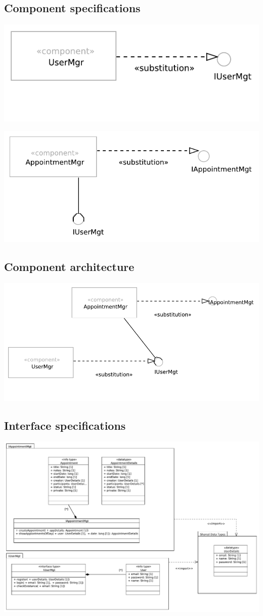 \documentclass[a4paper]{scrartcl}
\begin{document}
\subsection{Component specifications}

\includegraphics{pictures/UserMgr}

\includegraphics{pictures/AppointmentMgr}

\subsection{Component architecture}
\includegraphics[width=\textwidth]{pictures/ComponentArchitecture}

\subsection{Interface specifications}
\includegraphics[width=\textwidth]{pictures/InterfaceSpecification}
\end{document}
